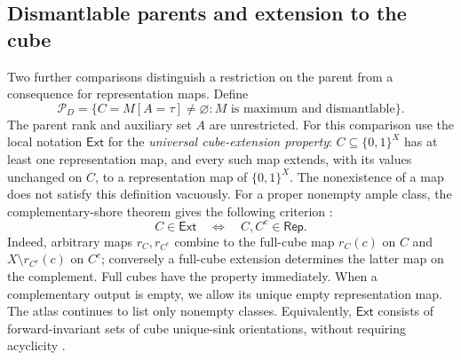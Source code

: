 \documentclass[11pt]{article}
\theoremstyle{definition}
\newcommand{\bits}{\{0,1\}}
\newcommand{\Rep}{\mathsf{Rep}}
\begin{document}
\subsection{Dismantlable parents and extension to the cube}
\label{sec:maxmin-neighbors}

Two further comparisons distinguish a restriction on the parent from a
consequence for representation maps. Define
\begin{equation}\label{eq:dismantlable-parent-family}
 \mathcal P_D=
 \{C=M[A=\tau]\ne\varnothing:M\text{ is maximum and dismantlable}\}.
\end{equation}
The parent rank and auxiliary set $A$ are unrestricted. For this comparison
use the local notation $\mathsf{Ext}$ for the \emph{universal cube-extension
property}: $C\subseteq\bits^X$ has at least one representation map, and
every such map extends, with its values unchanged on $C$, to a
representation map of $\bits^X$. The nonexistence of a map does not satisfy
this definition vacuously. For a proper nonempty ample class, the
complementary-shore theorem gives the following criterion
\cite[Definition~\textnormal{Universal cube extension} and
Lemma~\textnormal{Complementary-shore criterion for universal extension}]{Partition}:
\begin{equation}\label{eq:cube-extension-complement}
 C\in\mathsf{Ext}
 \quad\Longleftrightarrow\quad
 C,C^c\in\Rep.
\end{equation}
Indeed, arbitrary maps $r_C,r_{C^c}$ combine to the full-cube map
$r_C(c)$ on $C$ and $X\setminus r_{C^c}(c)$ on $C^c$; conversely a
full-cube extension determines the latter map on the complement.
Full cubes have the property immediately. When a complementary output is
empty, we allow its unique empty representation map. The atlas continues
to list only nonempty classes. Equivalently, $\mathsf{Ext}$ consists of
forward-invariant sets of cube unique-sink orientations, without requiring
acyclicity \cite{OrientationClasses}.
\end{document}
